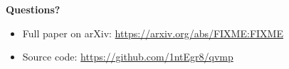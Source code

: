 \documentclass[10pt]{beamer}
\newcommand{\arxivid}{FIXME:FIXME}
\begin{document}

\begin{frame}
  \centering \huge \textbf{Questions?}

  \vspace{2cm}

  \small
  \begin{itemize}
      \item Full paper on arXiv: \url{https://arxiv.org/abs/\arxivid}
      \item Source code: \url{https://github.com/1ntEgr8/qvmp}
  \end{itemize}
\end{frame}
\end{document}
